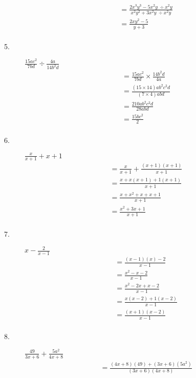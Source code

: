\documentclass{article}
\begin{document}
\begin{description}
$$\begin{aligned}
                 & = \frac{2x^3 y^3 - 5x^2y\ \div x^2y}{x^2y^2+3x^2y\ \div x^2y} \\
                 & = \frac{2x y^2 - 5}{y+3}                                      \\
            \end{aligned}
        $$
    \item[5. ] $\frac{15ac^2}{7bd} \div \frac{4a}{14b^2d}$
        $$
            \begin{aligned}
                 & = \frac{15ac^2}{7bd} \times \frac{14b^2d}{4a}     \\
                 & = \frac{(15 \times 14) ab^2c^2d}{(7\times 4) abd} \\
                 & = \frac{210 ab^2c^2d}{28 abd}                     \\
                 & = \frac{15bc^2}{2}                                \\
            \end{aligned}
        $$
    \item[6. ] $\frac{x}{x+1} + x+1$
        $$
            \begin{aligned}
                 & = \frac{x}{x+1}+\frac{(x+1)(x+1)}{x+1} \\
                 & = \frac{x+x(x+1)+1(x+1)}{x+1}          \\
                 & = \frac{x+x^2+x+x+1}{x+1}              \\
                 & = \frac{x^2+3x+1}{x+1}                 \\
            \end{aligned}
        $$
    \item[7. ] $x-\frac{2}{x-1}$
        $$
            \begin{aligned}
                 & = \frac{(x-1)(x) - 2}{x-1}     \\
                 & = \frac{x^2-x - 2}{x-1}        \\
                 & = \frac{x^2 - 2x + x - 2}{x-1} \\
                 & = \frac{x(x-2)+1(x-2)}{x-1}    \\
                 & = \frac{(x+1)(x-2)}{x-1}       \\
            \end{aligned}
        $$
    \item[8. ] $\frac{49}{3x+6} + \frac{5a^2}{4x+8}$
        $$
            \begin{aligned}
                 & = \frac{(4x+8)(49) + (3x+6)(5a^2)}{(3x+6)(4x+8)}                       \\

\end{aligned}$$
\end{description}
\end{document}
